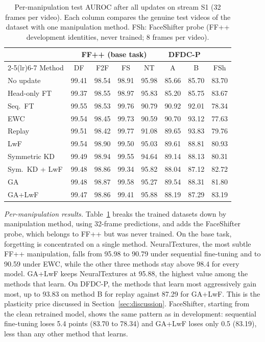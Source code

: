 \documentclass{ieeeaccess}
\newcommand{\ffpp}{FF{+}{+}}
\begin{document}
\begin{table}[t]
\caption{Per-manipulation test AUROC after all updates on stream S1 (32 frames per video). Each column compares the genuine test videos of the dataset with one manipulation method. FSh: FaceShifter probe (\ffpp{} development identities, never trained; 8 frames per video).}
\label{tab:permanip}
\centering
\footnotesize
\setlength{\tabcolsep}{2.7pt}
\begin{tabular}{@{}lccccccc@{}}
\toprule
& \multicolumn{4}{c}{\ffpp{} (base task)} & \multicolumn{2}{c}{DFDC-P} & \\
\cmidrule(lr){2-5}\cmidrule(lr){6-7}
Method & DF & F2F & FS & NT & A & B & FSh \\
\midrule
No update & 99.41 & 98.54 & 98.91 & 95.98 & 85.66 & 85.70 & 83.70 \\
Head-only FT & 99.37 & 98.55 & 98.97 & 95.83 & 85.20 & 85.75 & 83.67 \\
Seq.\ FT & 99.55 & 98.53 & 99.76 & 90.79 & 90.92 & 92.01 & 78.34 \\
EWC & 99.54 & 98.45 & 99.73 & 90.59 & 90.70 & 93.12 & 77.63 \\
Replay & 99.51 & 98.42 & 99.77 & 91.08 & 89.65 & 93.83 & 79.76 \\
LwF & 99.54 & 98.90 & 99.50 & 95.03 & 89.61 & 88.81 & 80.93 \\
Symmetric KD & 99.49 & 98.94 & 99.55 & 94.64 & 89.14 & 88.13 & 80.31 \\
Sym.\ KD + LwF & 99.48 & 98.86 & 99.34 & 95.82 & 88.04 & 87.12 & 82.72 \\
GA & 99.48 & 98.87 & 99.58 & 95.27 & 89.54 & 88.31 & 81.80 \\
GA+LwF & 99.47 & 98.86 & 99.41 & 95.88 & 88.19 & 87.29 & 83.19 \\
\bottomrule
\end{tabular}
\end{table}

\textit{Per-manipulation results.} Table~\ref{tab:permanip} breaks the trained datasets down by manipulation method, using 32-frame predictions, and adds the FaceShifter probe, which belongs to \ffpp{} but was never trained. On the base task, forgetting is concentrated on a single method. NeuralTextures, the most subtle \ffpp{} manipulation, falls from 95.98 to 90.79 under sequential fine-tuning and to 90.59 under EWC, while the other three methods stay above 98.4 for every model. GA+LwF keeps NeuralTextures at 95.88, the highest value among the methods that learn. On DFDC-P, the methods that learn most aggressively gain most, up to 93.83 on method B for replay against 87.29 for GA+LwF. This is the plasticity price discussed in Section~\ref{sec:discussion}. FaceShifter, starting from the clean retrained model, shows the same pattern as in development: sequential fine-tuning loses 5.4 points (83.70 to 78.34) and GA+LwF loses only 0.5 (83.19), less than any other method that learns.
\end{document}

